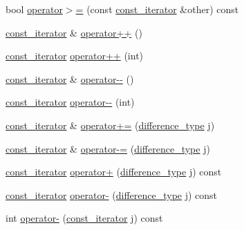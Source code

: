 \begin{DoxyCompactItemize}
\item 
bool \hyperlink{class_q_list_1_1const__iterator_aab6f2d1a5b1d0a313580123be000d0bb}{operator$>$=} (const \hyperlink{class_q_list_1_1const__iterator}{const\+\_\+iterator} \&other) const 
\item 
\hyperlink{class_q_list_1_1const__iterator}{const\+\_\+iterator} \& \hyperlink{class_q_list_1_1const__iterator_a429a8e3aa3de97b20c59f0a8524c94d9}{operator++} ()
\item 
\hyperlink{class_q_list_1_1const__iterator}{const\+\_\+iterator} \hyperlink{class_q_list_1_1const__iterator_ad040d3871a716a76f1b57705fb666bd5}{operator++} (int)
\item 
\hyperlink{class_q_list_1_1const__iterator}{const\+\_\+iterator} \& \hyperlink{class_q_list_1_1const__iterator_ac84c629637f34370020d66afc3a2a2cf}{operator-\/-\/} ()
\item 
\hyperlink{class_q_list_1_1const__iterator}{const\+\_\+iterator} \hyperlink{class_q_list_1_1const__iterator_a46d687d497d7aa49e5b65d52d3b4eb20}{operator-\/-\/} (int)
\item 
\hyperlink{class_q_list_1_1const__iterator}{const\+\_\+iterator} \& \hyperlink{class_q_list_1_1const__iterator_afe9c88b39e111149d46cddc4a4caf445}{operator+=} (\hyperlink{class_q_list_1_1const__iterator_a3fd13f34a4cad0b55bff738b349a87c6}{difference\+\_\+type} j)
\item 
\hyperlink{class_q_list_1_1const__iterator}{const\+\_\+iterator} \& \hyperlink{class_q_list_1_1const__iterator_a4a975b8077a87db810d6cb3606e23558}{operator-\/=} (\hyperlink{class_q_list_1_1const__iterator_a3fd13f34a4cad0b55bff738b349a87c6}{difference\+\_\+type} j)
\item 
\hyperlink{class_q_list_1_1const__iterator}{const\+\_\+iterator} \hyperlink{class_q_list_1_1const__iterator_a38269688da0773c04e5207ab9828f965}{operator+} (\hyperlink{class_q_list_1_1const__iterator_a3fd13f34a4cad0b55bff738b349a87c6}{difference\+\_\+type} j) const 
\item 
\hyperlink{class_q_list_1_1const__iterator}{const\+\_\+iterator} \hyperlink{class_q_list_1_1const__iterator_a15eef6f9c016b44cebdc748d35a25f05}{operator-\/} (\hyperlink{class_q_list_1_1const__iterator_a3fd13f34a4cad0b55bff738b349a87c6}{difference\+\_\+type} j) const 
\item 
int \hyperlink{class_q_list_1_1const__iterator_ad67a8f57c648efb3675f8cb9f3dc7d00}{operator-\/} (\hyperlink{class_q_list_1_1const__iterator}{const\+\_\+iterator} j) const 
\end{DoxyCompactItemize}
